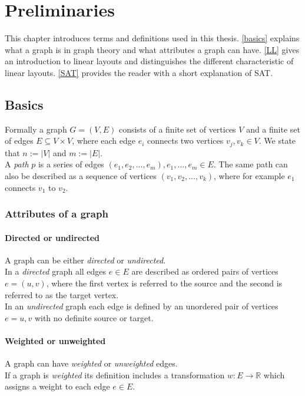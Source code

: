 
\chapter{Preliminaries}
  \label{PR}
This chapter introduces terms and definitions used in this thesis. \autoref{basics} explains what a graph is in graph theory and what attributes a graph can have. 
\autoref{LL} gives an introduction to linear layouts and distinguishes the different characteristic of linear layouts.
\autoref{SAT} provides the reader with a short explanation of SAT. 
\section{Basics}
\label{basics}
Formally a graph $G = (V, E)$ consists of a finite set of vertices $V$ and a finite set of edges $E \subseteq V \times V$, where each edge $e_i$ connects two vertices $v_j, v_k \in V$. We state that $n := |V|$ and $m := |E|$.\\
A \textit{path} $p$ is a series of edges $(e_1, e_2,...,e_m), e_1,...,e_m \in E$. The same path can also be described as a sequence of vertices $(v_1,v_2,...,v_k)$, where for example $e_1$ connects $v_1$ to $v_2$.
\subsection{Attributes of a graph}
\subsubsection{Directed or undirected}
A graph can be either \textit{directed} or \textit{undirected}.\\
In a \textit{directed} graph all edges $e \in E$ are described as ordered pairs of vertices $e = (u,v)$, where the first vertex is referred to the source and the second is referred to as the target vertex.\\
In an \textit{undirected} graph each edge is defined by an unordered pair of vertices $e = {u,v}$ with no definite source or target. 
\subsubsection{Weighted or unweighted}
A graph can have \textit{weighted} or \textit{unweighted} edges.\\
If a graph is \textit{weighted} its definition includes a transformation $w: E \rightarrow \mathbb{R}$ which assigns a weight to each edge $e \in E$. 

